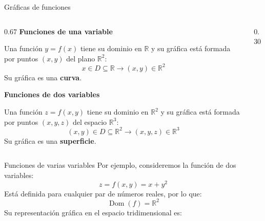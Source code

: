 \documentclass[main.tex]{subfiles}
\begin{document}
\begin{frame}{Gráficas de funciones}
\begin{columns}[c]
\begin{column}{0.67\textwidth}
\textbf{Funciones de una variable}
\medskip

Una función $y=f(x)$ tiene su dominio en $\mathbb{R}$ y su gráfica está formada por puntos $(x,y)$ del plano $\mathbb{R}^2$:
\[
x\in D\subseteq\mathbb{R}\longrightarrow (x,y)\in\mathbb{R}^2
\]
Su gráfica es una \textbf{curva}.
\vspace{0.4cm}

\textbf{Funciones de dos variables}
\medskip

Una función $z=f(x,y)$ tiene su dominio en $\mathbb{R}^2$ y su gráfica está formada por puntos $(x,y,z)$ del espacio $\mathbb{R}^3$:
\[
(x,y)\in D\subseteq\mathbb{R}^2\longrightarrow (x,y,z)\in\mathbb{R}^3
\]
Su gráfica es una \textbf{superficie}.
\end{column}
\begin{column}{0.30\textwidth}
\centering
{}
\end{column}
\end{columns}
\end{frame}




\begin{frame}{Funciones de varias variables}
Por ejemplo, consideremos la función de dos variables:
\[
z=f(x,y)=x+y^2
\]
Está definida para cualquier par de números reales, por lo que:
\[
\operatorname{Dom}(f)=\mathbb{R}^2
\]
Su representación gráfica en el espacio tridimensional es:
\end{frame}
\end{document}
